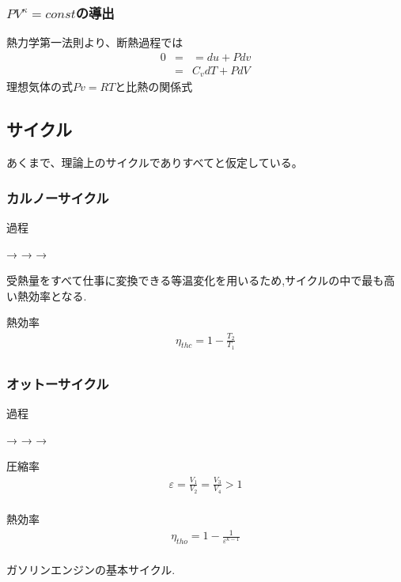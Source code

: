\documentclass[a4paper]{jsarticle}
\begin{document}
\subsubsection*{$PV^\kappa=const$の導出}
熱力学第一法則より、断熱過程では
\begin{eqnarray*}
    0&=&=du+Pdv\\
    &=&C_vdT+PdV
\end{eqnarray*}
理想気体の式$Pv=RT$と比熱の関係式
\subsection{サイクル}
あくまで、理論上のサイクルでありすべてと仮定している。
\subsubsection{カルノーサイクル}
\begin{itembox}[l]{過程}
    \begin{center}
        \quad → \quad {} \quad → \quad {} \quad → \quad {}
    \end{center}
\end{itembox}
受熱量をすべて仕事に変換できる等温変化を用いるため,サイクルの中で最も高い熱効率となる.
\begin{itembox}[l]{熱効率}
    \begin{eqnarray*}
        \eta_{thc}=1-\frac{T_2}{T_1}\\
    \end{eqnarray*}
\end{itembox}
\subsubsection{オットーサイクル}
\begin{itembox}[l]{過程}
    \begin{center}
        \quad → \quad {} \quad → \quad {} \quad → \quad {}
    \end{center}
\end{itembox}
\begin{itembox}[l]{圧縮率}
    \begin{eqnarray*}
        \varepsilon=\frac{V_1}{V_2}=\frac{V_3}{V_4}> 1\\
    \end{eqnarray*}
\end{itembox}
\begin{itembox}[l]{熱効率}
    \begin{eqnarray*}
        \eta_{tho}=1-\frac{1}{\varepsilon^{\kappa-1}}\\
    \end{eqnarray*}
\end{itembox}
ガソリンエンジンの基本サイクル.
\end{document}
